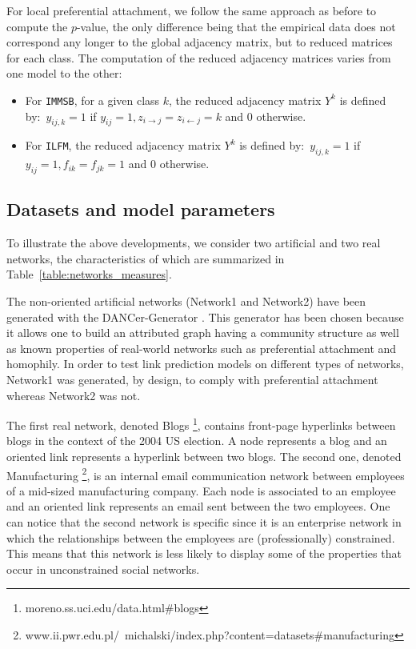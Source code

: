 \documentclass{llncs}
\newcommand{\ifm}{\texttt{ILFM}}
\newcommand{\imb}{\texttt{IMMSB}}
\begin{document}
For local preferential attachment, we follow the same approach as before to compute the $p$-value, the only difference being that the empirical data does not correspond any longer to the global adjacency matrix, but to reduced matrices for each class. The computation of the reduced adjacency matrices varies from one model to the other:
%
\begin{itemize}
    \item For \imb, for a given class $k$, the reduced adjacency matrix $Y^k$ is defined by:~$y_{ij,k}=1$ if $y_{ij}=1, z_{i\rightarrow j}=z_{i\leftarrow j}=k$ and $0$ otherwise.
    \item For \ifm, the reduced adjacency matrix $Y^k$ is defined by:~$ y_{ij,k}=1$ if $y_{ij}=1 , f_{ik}=f_{jk}=1$ and $0$ otherwise.
\end{itemize}
%

\subsection{Datasets and model parameters}

To illustrate the above developments, we consider two artificial and two real networks, the characteristics of which are summarized in Table~\ref{table:networks_measures}.



The non-oriented artificial networks (Network1 and Network2) have been generated with the DANCer-Generator \cite{largeron2015}. This generator has been chosen because it allows one to build an attributed graph having a community structure as well as known properties of real-world networks such as preferential attachment and homophily. In order to test link prediction models on different types of networks, Network1 was generated, by design, to comply with preferential attachment whereas Network2 was not.

The first real network, denoted Blogs \footnote{moreno.ss.uci.edu/data.html\#blogs}, contains front-page hyperlinks between blogs in the context of the 2004 US election. A node represents a blog and an oriented link represents a hyperlink between two blogs. The second one, denoted Manufacturing \footnote{www.ii.pwr.edu.pl/~michalski/index.php?content=datasets\#manufacturing}, is an internal email communication network between employees of a mid-sized manufacturing company. Each node is associated to an employee and an oriented link represents an email sent between the two employees. One can notice that the second network is specific since it is an enterprise network in which the relationships between the employees are (professionally) constrained. This means that this network is less likely to display some of the properties that occur in unconstrained social networks.
\end{document}

